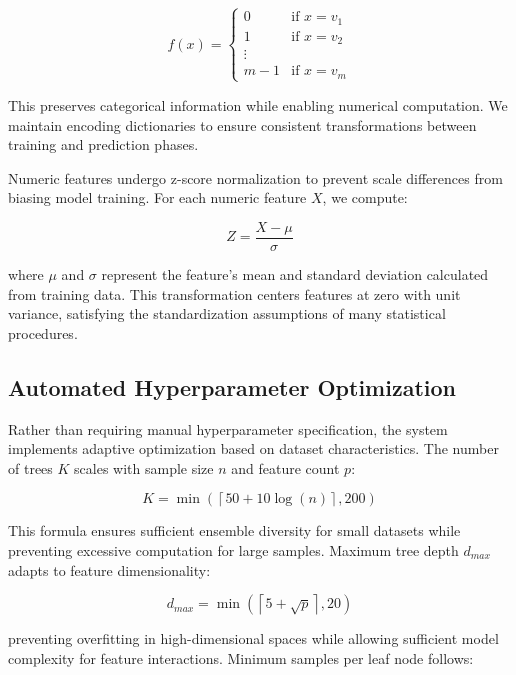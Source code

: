 \documentclass[conference]{IEEEtran}
\begin{document}
\begin{equation}
f(x) = \begin{cases}
0 & \text{if } x = v_1 \\
1 & \text{if } x = v_2 \\
\vdots \\
m-1 & \text{if } x = v_m
\end{cases}
\end{equation}

This preserves categorical information while enabling numerical computation. We maintain encoding dictionaries to ensure consistent transformations between training and prediction phases.

Numeric features undergo z-score normalization to prevent scale differences from biasing model training. For each numeric feature $X$, we compute:

\begin{equation}
Z = \frac{X - \mu}{\sigma}
\end{equation}

where $\mu$ and $\sigma$ represent the feature's mean and standard deviation calculated from training data. This transformation centers features at zero with unit variance, satisfying the standardization assumptions of many statistical procedures.

\subsection{Automated Hyperparameter Optimization}

Rather than requiring manual hyperparameter specification, the system implements adaptive optimization based on dataset characteristics. The number of trees $K$ scales with sample size $n$ and feature count $p$:

\begin{equation}
K = \min\left(\left\lceil 50 + 10 \log(n) \right\rceil, 200\right)
\end{equation}

This formula ensures sufficient ensemble diversity for small datasets while preventing excessive computation for large samples. Maximum tree depth $d_{max}$ adapts to feature dimensionality:

\begin{equation}
d_{max} = \min\left(\left\lceil 5 + \sqrt{p} \right\rceil, 20\right)
\end{equation}

preventing overfitting in high-dimensional spaces while allowing sufficient model complexity for feature interactions. Minimum samples per leaf node follows:
\end{document}
